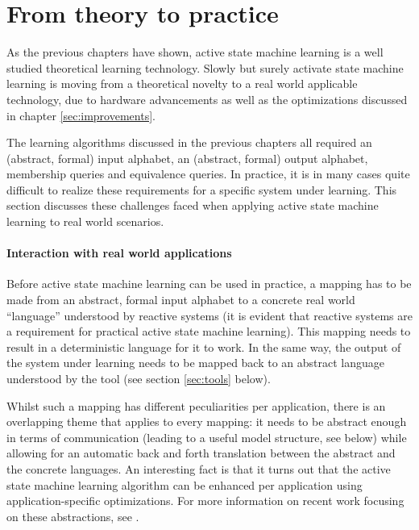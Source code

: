 \documentclass[multi,crop=false,class=article]{standalone}
\begin{document}
\section{From theory to practice}
\label{sec:theory-to-practice}

As the previous chapters have shown, active state machine learning is a well
studied theoretical learning technology. Slowly but surely activate state
machine learning is moving from a theoretical novelty to a real world applicable
technology, due to hardware advancements as well as the optimizations discussed
in chapter \cref{sec:improvements}.

The learning algorithms discussed in the previous chapters all required an
(abstract, formal) input alphabet, an (abstract, formal) output alphabet,
membership queries and equivalence queries. In practice, it is in many cases
quite difficult to realize these requirements for a specific system under
learning\cite{Steffen2011a}. This section discusses these challenges faced when
applying active state machine learning to real world scenarios.

\paragraph{Interaction with real world applications} Before active state machine
learning can be used in practice, a mapping has to be made from an abstract,
formal input alphabet to a concrete real world ``language'' understood by
reactive systems (it is evident that reactive systems are a requirement for
practical active state machine learning). This mapping needs to result in a deterministic language for it to
work\cite{Steffen2011a}. In the same way, the output of the system under learning
needs to be mapped back to an abstract language understood by the tool (see
section \cref{sec:tools} below).

Whilst such a mapping has different peculiarities per application, there is an
overlapping theme that applies to every mapping: it needs to be abstract enough
in terms of communication (leading to a useful model structure, see below) while
allowing for an automatic back and forth translation between the abstract and
the concrete languages\cite{Steffen2011a}. An interesting fact is that it turns
out that the active state machine learning algorithm can be enhanced per
application using application-specific optimizations\cite{Hungar2003}. For more
information on recent work focusing on these abstractions, see
\cite{Aarts2010,Howar2011,Jonsson2011}.
\end{document}
